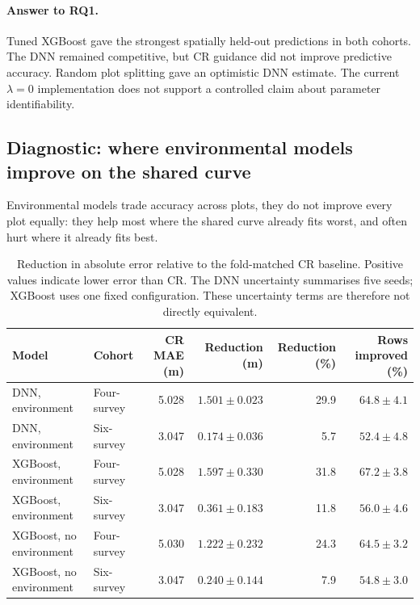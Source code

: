 
\paragraph*{Answer to RQ1.}
Tuned XGBoost gave the strongest spatially held-out predictions in both cohorts. The DNN remained
competitive, but CR guidance did not improve predictive accuracy. Random plot splitting gave an
optimistic DNN estimate. The current $\lambda=0$ implementation does not support a controlled
claim about parameter identifiability.


\subsection{Diagnostic: where environmental models improve on the shared curve}
\label{sec:results-rq1-cr-reduction}

Environmental models trade accuracy across plots, they do not improve every plot equally: they
help most where the shared curve already fits worst, and often hurt where it already fits best.

\begin{table}[!htbp]
\centering
\scriptsize
\renewcommand{\arraystretch}{1.1}
\begin{tabular}{llrrrr}
\toprule
Model & Cohort & CR MAE (m) & Reduction (m) & Reduction (\%) & Rows improved (\%) \\
\midrule
DNN, environment & Four-survey & 5.028 & $1.501\pm0.023$ & 29.9 & $64.8\pm4.1$ \\
DNN, environment & Six-survey & 3.047 & $0.174\pm0.036$ & 5.7 & $52.4\pm4.8$ \\
XGBoost, environment & Four-survey & 5.028 & $1.597\pm0.330$ & 31.8 & $67.2\pm3.8$ \\
XGBoost, environment & Six-survey & 3.047 & $0.361\pm0.183$ & 11.8 & $56.0\pm4.6$ \\
XGBoost, no environment & Four-survey & 5.030 & $1.222\pm0.232$ & 24.3 & $64.5\pm3.2$ \\
XGBoost, no environment & Six-survey & 3.047 & $0.240\pm0.144$ & 7.9 & $54.8\pm3.0$ \\
\bottomrule
\end{tabular}
\caption{Reduction in absolute error relative to the fold-matched CR baseline. Positive values
indicate lower error than CR. The DNN uncertainty summarises five seeds; XGBoost uses one fixed
configuration. These uncertainty terms are therefore not directly equivalent.}
\label{tab:results-cr-reduction}
\end{table}

